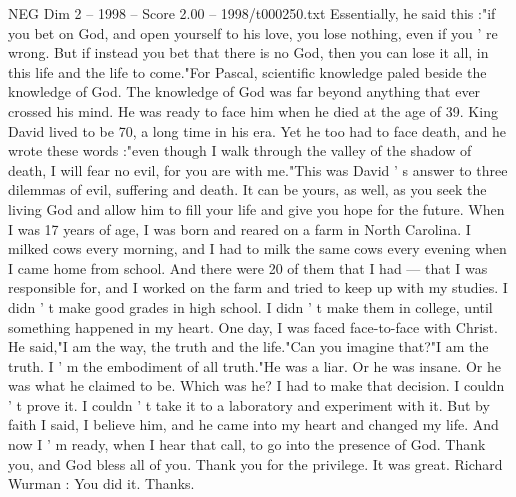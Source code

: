 \begin{textsample}{NEG Dim 2 – 1998 – Score 2.00 – 1998/t000250.txt}
Essentially, he said this :"if you bet on God, and open yourself to his love, you lose nothing, even if you ' re wrong.
But if instead you bet that there is no God, then you can lose it all, in this life and the life to come."For Pascal, scientific knowledge paled beside the knowledge of God.
The knowledge of God was far beyond anything that ever crossed his mind.
He was ready to face him when he died at the age of 39.
King David lived to be 70, a long time in his era.
Yet he too had to face death, and he wrote these words :"even though I walk through the valley of the shadow of death, I will fear no evil, for you are with me."This was David ' s answer to three dilemmas of evil, suffering and death.
It can be yours, as well, as you seek the living God and allow him to fill your life and give you hope for the future.
When I was 17 years of age, I was born and reared on a farm in North Carolina.
I milked cows every morning, and I had to milk the same cows every evening when I came home from school.
And there were 20 of them that I had — that I was responsible for, and I worked on the farm and tried to keep up with my studies.
I didn ' t make good grades in high school.
I didn ' t make them in college, until something happened in my heart.
One day, I was faced face-to-face with Christ.
He said,"I am the way, the truth and the life."Can you imagine that?"I am the truth.
I ' m the embodiment of all truth."He was a liar.
Or he was insane.
Or he was what he claimed to be.
Which was he?
I had to make that decision.
I couldn ' t prove it.
I couldn ' t take it to a laboratory and experiment with it.
But by faith I said, I believe him, and he came into my heart and changed my life.
And now I ' m ready, when I hear that call, to go into the presence of God.
Thank you, and God bless all of you.
Thank you for the privilege.
It was great.
Richard Wurman : You did it.
Thanks.

\end{textsample}
